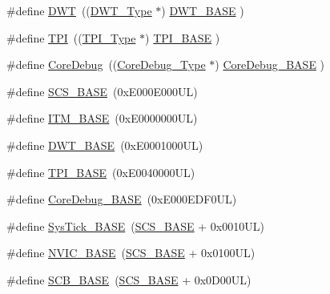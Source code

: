 \begin{DoxyCompactItemize}
\item 
\#define \hyperlink{group___c_m_s_i_s__core__base_gabbe5a060185e1d5afa3f85b14e10a6ce}{D\+WT}~((\hyperlink{struct_d_w_t___type}{D\+W\+T\+\_\+\+Type}       $\ast$)     \hyperlink{group___c_m_s_i_s__core__base_gafdab534f961bf8935eb456cb7700dcd2}{D\+W\+T\+\_\+\+B\+A\+SE}         )
\item 
\#define \hyperlink{group___c_m_s_i_s__core__base_ga8b4dd00016aed25a0ea54e9a9acd1239}{T\+PI}~((\hyperlink{struct_t_p_i___type}{T\+P\+I\+\_\+\+Type}       $\ast$)     \hyperlink{group___c_m_s_i_s__core__base_ga2b1eeff850a7e418844ca847145a1a68}{T\+P\+I\+\_\+\+B\+A\+SE}         )
\item 
\#define \hyperlink{group___c_m_s_i_s__core__base_gab6e30a2b802d9021619dbb0be7f5d63d}{Core\+Debug}~((\hyperlink{struct_core_debug___type}{Core\+Debug\+\_\+\+Type} $\ast$)     \hyperlink{group___c_m_s_i_s__core__base_ga680604dbcda9e9b31a1639fcffe5230b}{Core\+Debug\+\_\+\+B\+A\+SE}   )
\item 
\#define \hyperlink{group___c_m_s_i_s__core__base_ga3c14ed93192c8d9143322bbf77ebf770}{S\+C\+S\+\_\+\+B\+A\+SE}~(0x\+E000\+E000\+U\+L)
\item 
\#define \hyperlink{group___c_m_s_i_s__core__base_gadd76251e412a195ec0a8f47227a8359e}{I\+T\+M\+\_\+\+B\+A\+SE}~(0x\+E0000000\+U\+L)
\item 
\#define \hyperlink{group___c_m_s_i_s__core__base_gafdab534f961bf8935eb456cb7700dcd2}{D\+W\+T\+\_\+\+B\+A\+SE}~(0x\+E0001000\+U\+L)
\item 
\#define \hyperlink{group___c_m_s_i_s__core__base_ga2b1eeff850a7e418844ca847145a1a68}{T\+P\+I\+\_\+\+B\+A\+SE}~(0x\+E0040000\+U\+L)
\item 
\#define \hyperlink{group___c_m_s_i_s__core__base_ga680604dbcda9e9b31a1639fcffe5230b}{Core\+Debug\+\_\+\+B\+A\+SE}~(0x\+E000\+E\+D\+F0\+U\+L)
\item 
\#define \hyperlink{group___c_m_s_i_s__core__base_ga58effaac0b93006b756d33209e814646}{Sys\+Tick\+\_\+\+B\+A\+SE}~(\hyperlink{group___c_m_s_i_s__core__base_ga3c14ed93192c8d9143322bbf77ebf770}{S\+C\+S\+\_\+\+B\+A\+SE} +  0x0010\+U\+L)
\item 
\#define \hyperlink{group___c_m_s_i_s__core__base_gaa0288691785a5f868238e0468b39523d}{N\+V\+I\+C\+\_\+\+B\+A\+SE}~(\hyperlink{group___c_m_s_i_s__core__base_ga3c14ed93192c8d9143322bbf77ebf770}{S\+C\+S\+\_\+\+B\+A\+SE} +  0x0100\+U\+L)
\item 
\#define \hyperlink{group___c_m_s_i_s__core__base_gad55a7ddb8d4b2398b0c1cfec76c0d9fd}{S\+C\+B\+\_\+\+B\+A\+SE}~(\hyperlink{group___c_m_s_i_s__core__base_ga3c14ed93192c8d9143322bbf77ebf770}{S\+C\+S\+\_\+\+B\+A\+SE} +  0x0\+D00\+U\+L)

\end{DoxyCompactItemize}
